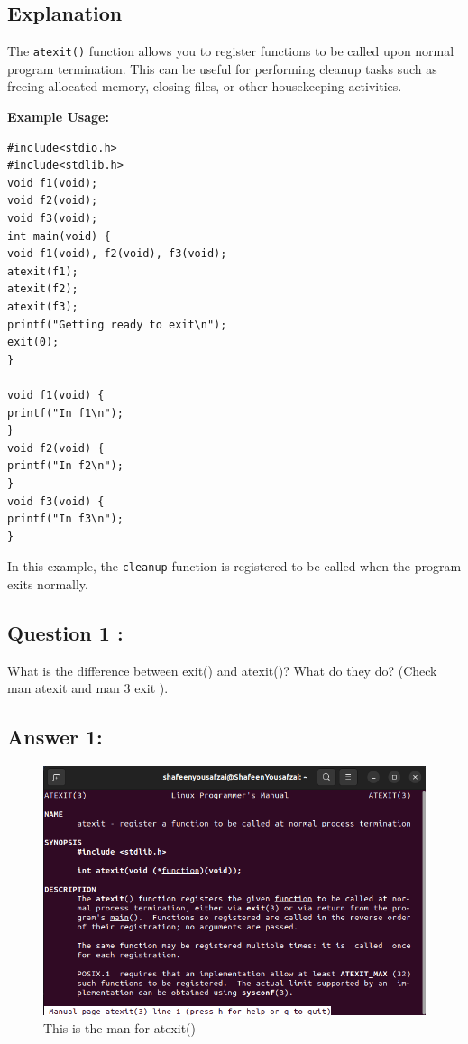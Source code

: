 \documentclass[12pt]{article}
\begin{document}
\subsection*{Explanation}

The \texttt{atexit()} function allows you to register functions to be called upon normal program termination. This can be useful for performing cleanup tasks such as freeing allocated memory, closing files, or other housekeeping activities.

\bigskip

\textbf{Example Usage:}

\begin{verbatim}
#include<stdio.h>
#include<stdlib.h>
void f1(void);
void f2(void);
void f3(void);
int main(void) {
void f1(void), f2(void), f3(void);
atexit(f1);
atexit(f2);
atexit(f3);
printf("Getting ready to exit\n");
exit(0);
}

void f1(void) {
printf("In f1\n");
}
void f2(void) {
printf("In f2\n");
}
void f3(void) {
printf("In f3\n");
}
\end{verbatim}

In this example, the \texttt{cleanup} function is registered to be called when the program exits normally.

\subsection{Question 1 : }
What is the difference between exit() and
atexit()? What do they do? (Check man
atexit and man 3 exit ).
\subsection{Answer 1: }
\begin{figure}[H]
    \centering
    \includegraphics[width=\textwidth]{4.png}
    \caption{This is the man for atexit()}
    \label{fig:enter-label}
\end{figure}
\end{document}
